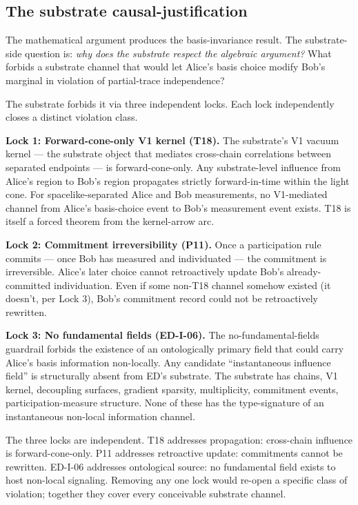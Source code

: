 \documentclass[11pt,a4paper]{article}
\begin{document}
\subsection{The substrate causal-justification}

The mathematical argument produces the basis-invariance result. The substrate-side question is: \emph{why does the substrate respect the algebraic argument?} What forbids a substrate channel that would let Alice's basis choice modify Bob's marginal in violation of partial-trace independence?

The substrate forbids it via three independent locks. Each lock independently closes a distinct violation class.

\textbf{Lock 1: Forward-cone-only V1 kernel (T18).} The substrate's V1 vacuum kernel --- the substrate object that mediates cross-chain correlations between separated endpoints --- is forward-cone-only. Any substrate-level influence from Alice's region to Bob's region propagates strictly forward-in-time within the light cone. For spacelike-separated Alice and Bob measurements, no V1-mediated channel from Alice's basis-choice event to Bob's measurement event exists. T18 is itself a forced theorem from the kernel-arrow arc.

\textbf{Lock 2: Commitment irreversibility (P11).} Once a participation rule commits --- once Bob has measured and individuated --- the commitment is irreversible. Alice's later choice cannot retroactively update Bob's already-committed individuation. Even if some non-T18 channel somehow existed (it doesn't, per Lock 3), Bob's commitment record could not be retroactively rewritten.

\textbf{Lock 3: No fundamental fields (ED-I-06).} The no-fundamental-fields guardrail forbids the existence of an ontologically primary field that could carry Alice's basis information non-locally. Any candidate ``instantaneous influence field'' is structurally absent from ED's substrate. The substrate has chains, V1 kernel, decoupling surfaces, gradient sparsity, multiplicity, commitment events, participation-measure structure. None of these has the type-signature of an instantaneous non-local information channel.

The three locks are independent. T18 addresses propagation: cross-chain influence is forward-cone-only. P11 addresses retroactive update: commitments cannot be rewritten. ED-I-06 addresses ontological source: no fundamental field exists to host non-local signaling. Removing any one lock would re-open a specific class of violation; together they cover every conceivable substrate channel.
\end{document}
